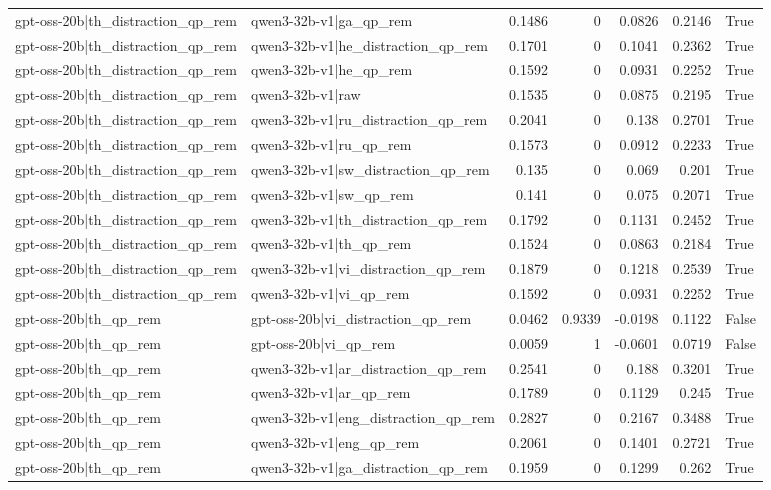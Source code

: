 \begin{table}
\begin{tabular}{l l r r r r l}
gpt-oss-20b|th_distraction_qp_rem & qwen3-32b-v1|ga_qp_rem & 0.1486 & 0 & 0.0826 & 0.2146 & True \\
gpt-oss-20b|th_distraction_qp_rem & qwen3-32b-v1|he_distraction_qp_rem & 0.1701 & 0 & 0.1041 & 0.2362 & True \\
gpt-oss-20b|th_distraction_qp_rem & qwen3-32b-v1|he_qp_rem & 0.1592 & 0 & 0.0931 & 0.2252 & True \\
gpt-oss-20b|th_distraction_qp_rem & qwen3-32b-v1|raw & 0.1535 & 0 & 0.0875 & 0.2195 & True \\
gpt-oss-20b|th_distraction_qp_rem & qwen3-32b-v1|ru_distraction_qp_rem & 0.2041 & 0 & 0.138 & 0.2701 & True \\
gpt-oss-20b|th_distraction_qp_rem & qwen3-32b-v1|ru_qp_rem & 0.1573 & 0 & 0.0912 & 0.2233 & True \\
gpt-oss-20b|th_distraction_qp_rem & qwen3-32b-v1|sw_distraction_qp_rem & 0.135 & 0 & 0.069 & 0.201 & True \\
gpt-oss-20b|th_distraction_qp_rem & qwen3-32b-v1|sw_qp_rem & 0.141 & 0 & 0.075 & 0.2071 & True \\
gpt-oss-20b|th_distraction_qp_rem & qwen3-32b-v1|th_distraction_qp_rem & 0.1792 & 0 & 0.1131 & 0.2452 & True \\
gpt-oss-20b|th_distraction_qp_rem & qwen3-32b-v1|th_qp_rem & 0.1524 & 0 & 0.0863 & 0.2184 & True \\
gpt-oss-20b|th_distraction_qp_rem & qwen3-32b-v1|vi_distraction_qp_rem & 0.1879 & 0 & 0.1218 & 0.2539 & True \\
gpt-oss-20b|th_distraction_qp_rem & qwen3-32b-v1|vi_qp_rem & 0.1592 & 0 & 0.0931 & 0.2252 & True \\
gpt-oss-20b|th_qp_rem & gpt-oss-20b|vi_distraction_qp_rem & 0.0462 & 0.9339 & -0.0198 & 0.1122 & False \\
gpt-oss-20b|th_qp_rem & gpt-oss-20b|vi_qp_rem & 0.0059 & 1 & -0.0601 & 0.0719 & False \\
gpt-oss-20b|th_qp_rem & qwen3-32b-v1|ar_distraction_qp_rem & 0.2541 & 0 & 0.188 & 0.3201 & True \\
gpt-oss-20b|th_qp_rem & qwen3-32b-v1|ar_qp_rem & 0.1789 & 0 & 0.1129 & 0.245 & True \\
gpt-oss-20b|th_qp_rem & qwen3-32b-v1|eng_distraction_qp_rem & 0.2827 & 0 & 0.2167 & 0.3488 & True \\
gpt-oss-20b|th_qp_rem & qwen3-32b-v1|eng_qp_rem & 0.2061 & 0 & 0.1401 & 0.2721 & True \\
gpt-oss-20b|th_qp_rem & qwen3-32b-v1|ga_distraction_qp_rem & 0.1959 & 0 & 0.1299 & 0.262 & True \\

\end{tabular}
\end{table}
